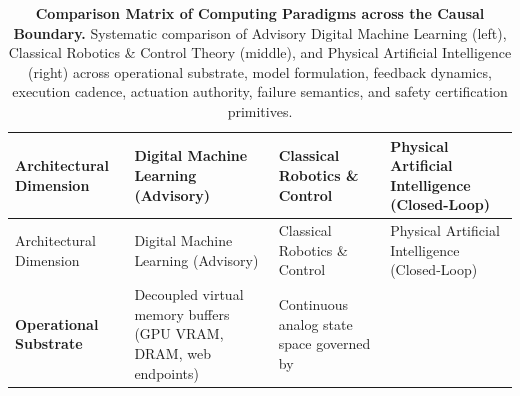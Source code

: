 \documentclass[
  10pt,
  letterpaper,
  twoside,
  openright,
  numbers=noenddot,
  headings=standardclasses
]{scrbook}
\begin{document}
\begin{longtable}[]{@{}
  >{\raggedright\arraybackslash}p{}
  >{\raggedright\arraybackslash}p{}
  >{\raggedright\arraybackslash}p{}
  >{\raggedright\arraybackslash}p{}@{}}
\caption{\textbf{Comparison Matrix of Computing Paradigms across the
Causal Boundary.} Systematic comparison of Advisory Digital Machine
Learning (left), Classical Robotics \& Control Theory (middle), and
Physical Artificial Intelligence (right) across operational substrate,
model formulation, feedback dynamics, execution cadence, actuation
authority, failure semantics, and safety certification
primitives.}\label{tbl-01-paradigm-comparison}\tabularnewline
\toprule\noalign{}
\begin{minipage}[b]{\linewidth}\raggedright
Architectural Dimension
\end{minipage} & \begin{minipage}[b]{\linewidth}\raggedright
Digital Machine Learning (Advisory)
\end{minipage} & \begin{minipage}[b]{\linewidth}\raggedright
Classical Robotics \& Control
\end{minipage} & \begin{minipage}[b]{\linewidth}\raggedright
Physical Artificial Intelligence (Closed-Loop)
\end{minipage} \\
\midrule\noalign{}
\endfirsthead
\toprule\noalign{}
\begin{minipage}[b]{\linewidth}\raggedright
Architectural Dimension
\end{minipage} & \begin{minipage}[b]{\linewidth}\raggedright
Digital Machine Learning (Advisory)
\end{minipage} & \begin{minipage}[b]{\linewidth}\raggedright
Classical Robotics \& Control
\end{minipage} & \begin{minipage}[b]{\linewidth}\raggedright
Physical Artificial Intelligence (Closed-Loop)
\end{minipage} \\
\midrule\noalign{}
\endhead
\bottomrule\noalign{}
\endlastfoot
\textbf{Operational Substrate} & Decoupled virtual memory buffers (GPU
VRAM, DRAM, web endpoints) & Continuous analog state space governed by

\end{longtable}
\end{document}
